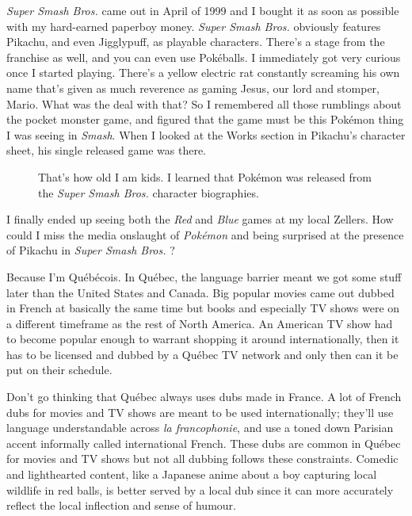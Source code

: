 \documentclass{book}
\begin{document}
\emph{Super Smash Bros.} came out in April of 1999 and I bought it as soon as possible with my hard-earned paperboy money. \emph{Super Smash Bros.} obviously features Pikachu, and even Jigglypuff, as playable characters. There’s a stage from the franchise as well, and you can even use Pokéballs. I immediately got very curious once I started playing. There’s a yellow electric rat constantly screaming his own name that’s given as much reverence as gaming Jesus, our lord and stomper, Mario. What was the deal with that? So I remembered all those rumblings about the pocket monster game, and figured that the game must be this Pokémon thing I was seeing in \emph{Smash}. When I looked at the Works section in Pikachu’s character sheet, his single released game was there.\par
\FloatBarrier\vspace{\baselineskip}\begin{figure}[H]\caption*{That’s how old I am kids. I learned that Pokémon was released from the \emph{Super Smash Bros.} character biographies.}\end{figure}
I finally ended up seeing both the \emph{Red} and \emph{Blue} games at my local Zellers. How could I miss the media onslaught of \emph{Pokémon} and being surprised at the presence of Pikachu in \emph{Super Smash Bros.} ?\par
Because I’m Québécois. In Québec, the language barrier meant we got some stuff later than the United States and Canada. Big popular movies came out dubbed in French at basically the same time but books and especially TV shows were on a different timeframe as the rest of North America. An American TV show had to become popular enough to warrant shopping it around internationally, then it has to be licensed and dubbed by a Québec TV network and only then can it be put on their schedule.\par
Don’t go thinking that Québec always uses dubs made in France. A lot of French dubs for movies and TV shows are meant to be used internationally; they’ll use language understandable across \emph{la francophonie}, and use a toned down Parisian accent informally called international French. These dubs are common in Québec for movies and TV shows but not all dubbing follows these constraints. Comedic and lighthearted content, like a Japanese anime about a boy capturing local wildlife in red balls, is better served by a local dub since it can more accurately reflect the local inflection and sense of humour.\par
\end{document}
